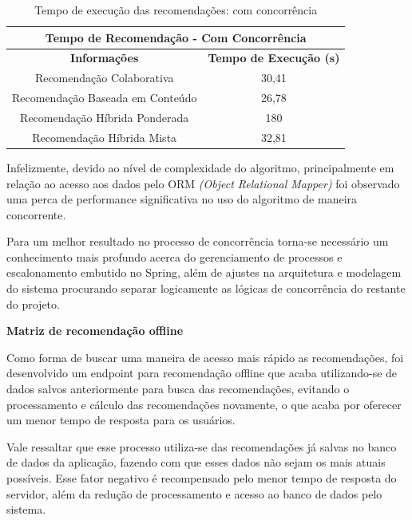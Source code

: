 \begin{table}[H]
\centering
\begin{tabular}{|c|c|}
\hline
\multicolumn{2}{|c|}{\textbf{Tempo de Recomendação - Com Concorrência}} \\ \hline
\textbf{Informações}                 & \textbf{Tempo de Execução (s)}    \\ \hline
Recomendação Colaborativa            & 30,41                              \\ \hline
Recomendação Baseada em Conteúdo     & 26,78                               \\ \hline
Recomendação Híbrida Ponderada       & 180                              \\ \hline
Recomendação Híbrida Mista           & 32,81                              \\ \hline
\end{tabular}
\caption{Tempo de execução das recomendações: com concorrência}
\label{tableref:execucaoRecomendacaoComConcorrencia}
\end{table}

Infelizmente, devido ao nível de complexidade do algoritmo, principalmente em relação ao acesso aos dados pelo ORM \textit{(Object Relational Mapper)} foi observado uma perca de performance significativa no uso do algoritmo de maneira concorrente.

Para um melhor resultado no processo de concorrência torna-se necessário um conhecimento mais profundo acerca do gerenciamento de processos e escalonamento embutido no Spring, além de ajustes na arquitetura e modelagem do sistema procurando separar logicamente as lógicas de concorrência do restante do projeto.

\textbf{Matriz de recomendação offline}

Como forma de buscar uma maneira de acesso mais rápido as recomendações, foi desenvolvido um endpoint para recomendação offline que acaba utilizando-se de dados salvos anteriormente para busca das recomendações, evitando o processamento e cálculo das recomendações novamente, o que acaba por oferecer um menor tempo de resposta para os usuários.

Vale ressaltar que esse processo utiliza-se das recomendações já salvas no banco de dados da aplicação, fazendo com que esses dados não sejam os mais atuais possíveis. Esse fator negativo é recompensado pelo menor tempo de resposta do servidor, além da redução de processamento e acesso ao banco de dados pelo sistema.

